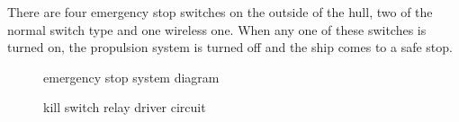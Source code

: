 \documentclass[lettersize,journal]{IEEEtran}
\begin{document}
There are four emergency stop switches on the outside of the hull, two of the normal switch type and one wireless one.
When any one of these switches is turned on, the propulsion system is turned off and the ship comes to a safe stop.

\begin{figure}[H]
    \begin{center}
    \end{center}
    \caption{emergency stop system diagram}
    \label{fig:emergency_stop_system_diagram}
\end{figure}


\begin{figure}[H]
    \begin{center}
    \end{center}
    \caption{kill switch relay driver circuit}
    \label{fig:kill_switch_relay_driver_circuit}
\end{figure}
\end{document}
